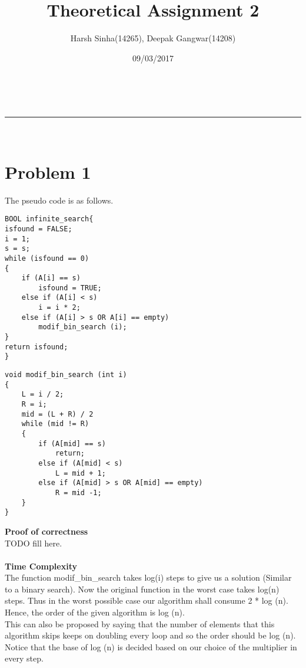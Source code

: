 \documentclass[a4paper,11pt]{article}
\makeatletter
\newcommand{\linia}{\rule{\linewidth}{0.5pt}}
\theoremstyle{mytheor}
\renewcommand{\maketitle}{
\begin{center}
\vspace{2ex}
{\huge \textsc{\@title}}
\vspace{1ex}
\\
\linia\\
\@author \hfill \@date
\vspace{4ex}
\end{center}
}
\makeatother
\begin{document}
\title{Theoretical Assignment \textnumero{} 2}

\author{Harsh Sinha(14265), Deepak Gangwar(14208)}

\date{09/03/2017}

\maketitle

\section*{Problem 1}

The pseudo code is as follows.

\begin{lstlisting}[label={list:first},caption=Pseudo code -- Search in an Infinite Array.]
BOOL infinite_search{
isfound = FALSE;
i = 1;
s = s;
while (isfound == 0)
{
	if (A[i] == s)
		isfound = TRUE;
	else if (A[i] < s)
		i = i * 2;
	else if (A[i] > s OR A[i] == empty)
		modif_bin_search (i);
}
return isfound;
}
\end{lstlisting}

\begin{lstlisting}[caption=modif\_bin\_search.]
void modif_bin_search (int i)
{
	L = i / 2;
	R = i;
	mid = (L + R) / 2
	while (mid != R)
	{
		if (A[mid] == s)
			return;
		else if (A[mid] < s)
			L = mid + 1;
		else if (A[mid] > s OR A[mid] == empty)
			R = mid -1;	
	}
}
\end{lstlisting}

\textbf{Proof of correctness}\\
TODO fill here.\\
\\

\textbf{Time Complexity}\\
The function modif\_bin\_search takes log(i) steps to give us a solution (Similar to a binary search). Now the original function in the worst case takes log(n) steps. Thus in the worst possible case our algorithm shall consume 2 * log (n). Hence, the order of the given algorithm is log (n).\\
This can also be proposed by saying that the number of elements that this algorithm skips keeps on doubling every loop and so the order should be log (n).\\
Notice that the base of log (n) is decided based on our choice of the multiplier in every step.
\end{document}
